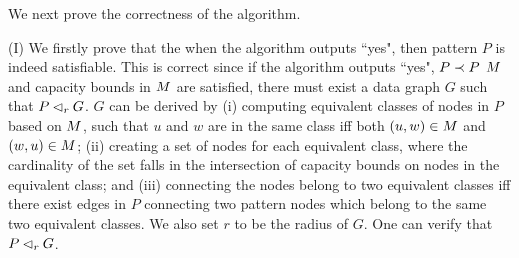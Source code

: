 \vspace{-1.5ex}
We next prove the correctness of the algorithm.

\vspace{-1.5ex}
(I) We firstly prove that the when the algorithm outputs ``yes", then pattern $P$ is indeed satisfiable.
This is correct since if the algorithm outputs ``yes", \ie $P \prec P$ \wrt $M$ and capacity bounds in $M$ are satisfied, there must exist a data graph $G$ such that $P \lhd_r G$.
$G$ can be derived by (i) computing equivalent classes of nodes in $P$ based on $M$, such that $u$ and $w$ are in the same class iff both $(u, w)\in M$ and $(w, u)\in M$;
(ii) creating a set of nodes for each equivalent class, where the cardinality of the set falls in the intersection of capacity bounds on nodes in the equivalent class; and
(iii) connecting the nodes belong to two equivalent classes iff there exist edges in $P$ connecting two pattern nodes which belong to the same two equivalent classes.
We also set $r$ to be the radius of $G$. One can verify that $P \lhd_r G$.

